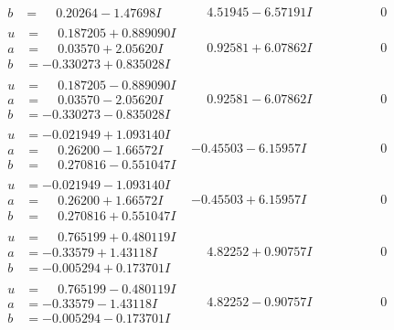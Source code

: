 \documentclass[1p]{elsarticle_modified}
\theoremstyle{definition}
\begin{document}
$$\begin{array}{c|c|c}
\begin{aligned}
b &= \phantom{-}0.20264 - 1.47698 I\end{aligned}
 & \phantom{-}4.51945 - 6.57191 I & \phantom{-0.000000 } 0 \\ \hline\begin{aligned}
u &= \phantom{-}0.187205 + 0.889090 I \\
a &= \phantom{-}0.03570 + 2.05620 I \\
b &= -0.330273 + 0.835028 I\end{aligned}
 & \phantom{-}0.92581 + 6.07862 I & \phantom{-0.000000 } 0 \\ \hline\begin{aligned}
u &= \phantom{-}0.187205 - 0.889090 I \\
a &= \phantom{-}0.03570 - 2.05620 I \\
b &= -0.330273 - 0.835028 I\end{aligned}
 & \phantom{-}0.92581 - 6.07862 I & \phantom{-0.000000 } 0 \\ \hline\begin{aligned}
u &= -0.021949 + 1.093140 I \\
a &= \phantom{-}0.26200 - 1.66572 I \\
b &= \phantom{-}0.270816 - 0.551047 I\end{aligned}
 & -0.45503 - 6.15957 I & \phantom{-0.000000 } 0 \\ \hline\begin{aligned}
u &= -0.021949 - 1.093140 I \\
a &= \phantom{-}0.26200 + 1.66572 I \\
b &= \phantom{-}0.270816 + 0.551047 I\end{aligned}
 & -0.45503 + 6.15957 I & \phantom{-0.000000 } 0 \\ \hline\begin{aligned}
u &= \phantom{-}0.765199 + 0.480119 I \\
a &= -0.33579 + 1.43118 I \\
b &= -0.005294 + 0.173701 I\end{aligned}
 & \phantom{-}4.82252 + 0.90757 I & \phantom{-0.000000 } 0 \\ \hline\begin{aligned}
u &= \phantom{-}0.765199 - 0.480119 I \\
a &= -0.33579 - 1.43118 I \\
b &= -0.005294 - 0.173701 I\end{aligned}
 & \phantom{-}4.82252 - 0.90757 I & \phantom{-0.000000 } 0 \\ \hline\begin{aligned}

\end{aligned}
\end{array}$$
\end{document}
